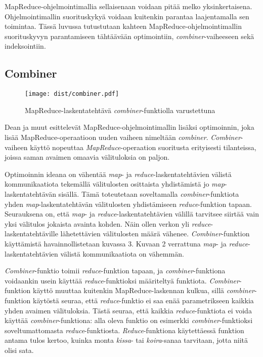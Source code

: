 \documentclass[finnish]{templates/tktltiki2}
\theoremstyle{definition}
\theoremstyle{remark}
\begin{document}
MapReduce-ohjelmointimallia sellaisenaan voidaan pitää melko
yksinkertaisena. Ohjelmointimallin suorituskykyä voidaan kuitenkin
parantaa laajentamalla sen toimintaa. Tässä luvussa tutustutaan kahteen
MapReduce-ohjelmointimallin suorituskyvyn parantamiseen tähtäävään
optimointiin, \emph{combiner}-vaiheeseen sekä indeksointiin.

\subsection{Combiner}\label{combiner}

\begin{figure}[!b]
\centering
\texttt{[image: dist/combiner.pdf]}
\caption{MapReduce-laskentatehtävä \emph{combiner}-funktiolla
varustettuna}
\end{figure}

Dean ja muut \cite{mapreduce} esittelevät
MapReduce-ohjelmointimallin lisäksi optimoinnin, joka lisää
MapReduce-operaatioon uuden vaiheen nimeltään \emph{combiner}.
\emph{Combiner}-vaiheen käyttö nopeuttaa \emph{MapReduce}-operaation
suoritusta erityisesti tilanteissa, joissa saman avaimen omaavia
välituloksia on paljon.

Optimoinnin ideana on vähentää \emph{map}- ja
\emph{reduce}-laskentatehtävien välistä kommunikaatiota tekemällä
välitulosten osittaista yhdistämistä jo \emph{map}-laskentatehtävän
sisällä. Tämä toteutetaan soveltamalla \emph{combiner}-funktiota yhden
\emph{map}-laskentatehtävän välitulosten yhdistämiseen
\emph{reduce}-funktion tapaan. Seurauksena on, että \emph{map}- ja
\emph{reduce}-laskentatehtävien välillä tarvitsee siirtää vain yksi
välitulos jokaista avainta kohden. Näin ollen verkon yli
\emph{reduce}-laskentatehtäville lähetettävien välitulosten määrä
vähenee. \emph{Combiner}-funktion käyttämistä havainnollistetaan kuvassa
3. Kuvaan 2 verrattuna \emph{map}- ja \emph{reduce}-laskentatehtävien
välistä kommunikaatiota on vähemmän.

\emph{Combiner}-funktio toimii \emph{reduce}-funktion tapaan, ja
\emph{combiner}-funktiona voidaankin usein käyttää
\emph{reduce}-funktioksi määriteltyä funktiota. \emph{Combiner}-funktion
käyttö muuttaa kuitenkin MapReduce-laskennan kulkua, sillä
\emph{combiner}-funktion käytöstä seuraa, että \emph{reduce}-funktio ei
saa enää parametrikseen kaikkia yhden avaimen välituloksia. Tästä
seuraa, että kaikkia \emph{reduce}-funktiota ei voida käyttää
\emph{combiner}-funktiona: alla oleva funktio on esimerkki
\emph{combiner}-funktioksi soveltumattomasta \emph{reduce}-funktiosta.
\emph{Reduce}-funktiona käytettäessä funktion antama tulos kertoo,
kuinka monta \emph{kissa}- tai \emph{koira}-sanaa tarvitaan, jotta niitä
olisi sata.
\end{document}

